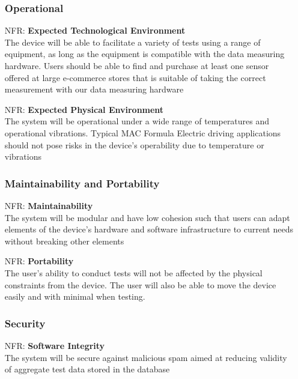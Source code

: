 \documentclass[12pt,titlepage]{article}
\newcounter{nfrnum} %
\begin{document}
\begin{itemize}
\subsubsection{Operational}

    \item[NFR\refstepcounter{nfrnum}\thenfrnum:]
      \textbf{Expected Technological Environment}\\
    The device will be able to facilitate a variety of tests using a range of equipment, as long as the equipment is compatible with the data measuring hardware. Users should be able to find and purchase at least one sensor offered at large e-commerce stores that is suitable of taking the correct measurement with our data measuring hardware

    \item[NFR\refstepcounter{nfrnum}\thenfrnum:]
    \textbf{Expected Physical Environment}\\
    The system will be operational under a wide range of temperatures and operational vibrations. Typical MAC Formula Electric driving applications should not pose risks in the device's operability due to temperature or vibrations

\subsubsection{Maintainability and Portability}

    \item[NFR\refstepcounter{nfrnum}\thenfrnum:]
      \textbf{Maintainability}\\
    The system will be modular and have low cohesion such that users can adapt elements of the device's hardware and software infrastructure to current needs without breaking other elements

    \item[NFR\refstepcounter{nfrnum}\thenfrnum:]
    \textbf{Portability}\\
    The user's ability to conduct tests will not be affected by the physical constraints from the device. The user will also be able to move the device easily and with minimal when testing.
  
\subsubsection{Security}

    \item[NFR\refstepcounter{nfrnum}\thenfrnum:]
    \textbf{Software Integrity}\\
    The system will be secure against malicious spam aimed at reducing validity of aggregate test data stored in the database

\end{itemize}
\end{document}
